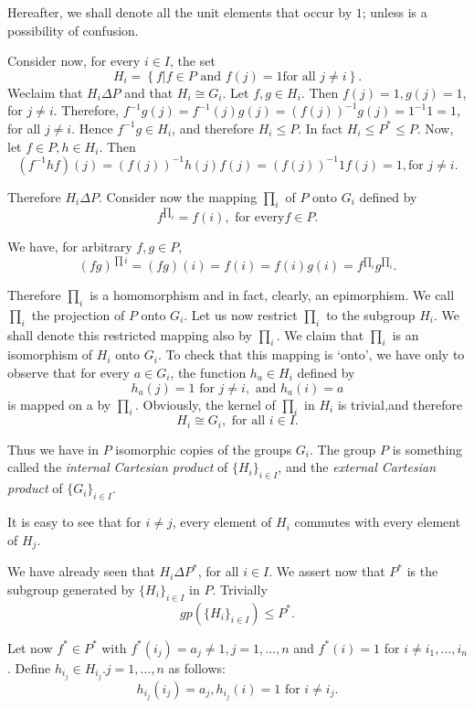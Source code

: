 Hereafter, we shall denote all the unit elements that occur by $1$;
unless is a possibility of confusion. 

Consider now, for every $i \in  I$, the set
$$
H_i = \left\{ f \bigg | f  \in  P \text{ and } f(j) =1 \text{
  for all } j \neq i \right\}. 
$$
We\pageoriginale claim that $H_i \Delta P$ and that $H_i \cong G_i$. Let $f, g
\in  H_i$. Then $f(j) =1, g(j) =1$, for $j \neq i$. Therefore,
$f^{-1}g(j)= f^{-1}(j) g(j)=(f(j))^{-1} g(j) = 1^{-1}1=1$, for all $j
\neq i$. Hence $f^{-1}g \in  H_i$, and therefore $H_i \le
P$. In fact $H_i \le P^* \le P$. Now, let $f \in  P, h
\in  H_i$. Then  
$$
(f^{-1}hf)(j) = (f(j))^{-1} h(j) f(j) =(f(j))^{-1} 1f(j) =1, \text{
  for } j \neq i. 
$$ 

Therefore $H_i \Delta P$. Consider now the mapping $\prod_i$ of $P$
onto $G_i$ defined by  
$$
f^{\prod_i}= f(i), \text{ for every} f \in  P.
$$

We have, for arbitrary $f, g \in  P$,
$$
(fg)^{\prod i}= (fg)(i) = f(i) = f(i) g(i) =  f^{\prod_i}g^{\prod_i}.
$$

Therefore $\prod_i$ is a homomorphism and in fact, clearly, an
epimorphism. We call $\prod_i$ the projection of $P$ onto $G_i$. Let
us now restrict $\prod_i$ to the subgroup $H_i$. We shall denote this
restricted mapping also by $\prod_i$. We claim that $\prod_i$ is an
isomorphism of $H_i$ onto $G_i$.  To check that this mapping is
`onto', we have only to observe that for every $a \in G_i$, the
function $h_a \in  H_i$ defined by  
$$
h_a (j) =1 \text{ for } j \neq i,  \text{ and } h_a (i) =a
$$
is mapped on a by $\prod_i$. Obviously, the kernel of $\prod_i$ in $H_i$ is
trivial,\pageoriginale and therefore 
$$
H_i  \cong G_i,  \text{ for all } i \in  I. 
$$

Thus we have in $P$ isomorphic copies of the groups $G_i$. The group
$P$ is something called the \textit{internal Cartesian product} of $\{
H_i \}_{i \in  I}$, and the \textit{external Cartesian product}
of $\{ G_i\}_{ i \in  I}$. 

It is easy to see that for $i \neq j$, every element of $H_i$ commutes
with every element of $H_j$. 

We have already seen that $H_i \Delta P^*$, for all $i \in 
I$. We assert now that $P^*$ is the subgroup generated by $\{ H_i
\}_{i \in  I}$ in $P$. Trivially 
$$
gp( \{ H_i \}_{i \in  I}) \le P^*.
$$

Let now $f^* \in  P^*$ with $f^*(i_j)= a_j \neq 1, j=1,  \ldots
, n$ and $f^*(i)=1$ for $i \neq i_1,  \ldots,  i_n$. Define $h_{i_j}
\in  H_{i_j}. j=1, \ldots,  n$ as follows: 
$$
h_{i_j} (i_j) = a_j, h_{i_j}(i)=1 \text{ for } i \neq i_j. 
$$

